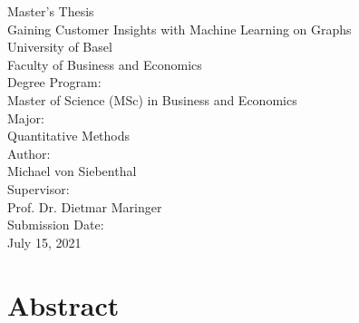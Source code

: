 \documentclass[12pt]{report}
\begin{document}
  
  \begin{titlepage}
    \begin{center}
      \vspace{1em}
	  \large{Master's Thesis}\\
	  \huge Gaining Customer Insights with Machine Learning on Graphs \\ 
	  \large \vspace{1em}
	  University of Basel\\
      Faculty of Business and Economics \\
	  \vspace{4em} 
	  \large
      Degree Program: \\
      Master of Science (MSc) in Business and Economics \\
      \vspace{2em}
      Major: \\
      Quantitative Methods \\
      \vspace{4em}
	  Author: \\
	  Michael von Siebenthal\\
	  \vspace{2em}
	  Supervisor: \\
	  Prof. Dr. Dietmar Maringer\\
	  \vspace{4em}
	  Submission Date: \\
      July 15, 2021
	  \vspace{3em}
    \end{center}
  \end{titlepage} 


  \chapter*{Abstract}
  
  \newpage

  \singlespacing
  \renewcommand{\contentsname}{Table of Contents}
  \setcounter{secnumdepth}{3}
  \setcounter{tocdepth}{3} 
  \tableofcontents
  
  \listoffigures

  \listoftables

  \listofalgocfs 
\end{document}
